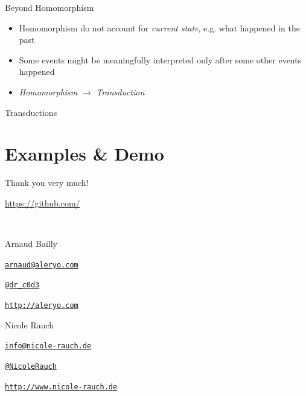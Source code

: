 \begin{frame}[fragile]{Beyond Homomorphism}
  \begin{itemize}
  \item Homomorphism do not account for \emph{current state}, e.g. what happened in the past
  \item Some events might be meaningfully interpreted only after some other events happened
  \item \emph{Homomorphism} $\longrightarrow$ \emph{Transduction}
  \end{itemize}
\end{frame}

\begin{frame}[fragile]{Transductions}
  \begin{itemize}
  \end{itemize}
\end{frame}

\section{Examples \& Demo}

\begin{frame}{Thank you very much!}

  \url{https://github.com/}

  ~\\[1em]
  \begin{block}{Arnaud Bailly}
        \begin{description}[Twitterxx]
        \item[E-Mail]  \href{mailto:arnaud@aleryo.com}{\texttt{arnaud@aleryo.com}}
        \item[Twitter] \href{http://twitter.com/NicoleRauch}{\texttt{@dr\_c0d3}}
        \item[Web] \href{http://aleryo.com}{\texttt{http://aleryo.com}}
        \end{description}
  \end{block}
  \begin{block}{Nicole Rauch}
    \begin{description}[Twitterxx]
    \item[E-Mail]  \href{mailto:info@nicole-rauch.de}{\texttt{info@nicole-rauch.de}}
    \item[Twitter] \href{http://twitter.com/NicoleRauch}{\texttt{@NicoleRauch}}
    \item[Web] \href{http://www.nicole-rauch.de}{\texttt{http://www.nicole-rauch.de}}
    \end{description}
  \end{block}
\end{frame}
